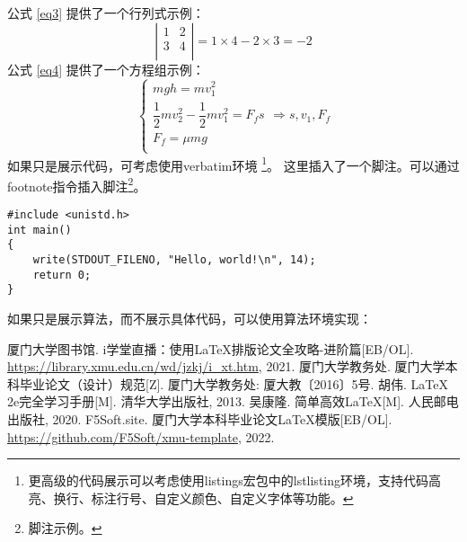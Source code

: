 \documentclass{xmu}
\begin{document}
公式 \ref{eq3} 提供了一个行列式示例：
\begin{equation}\label{eq3}
    \left|\begin{array}{cc}
        1 & 2 \\
        3 & 4 \\
    \end{array}\right|=1\times4-2\times3=-2
\end{equation}
公式 \ref{eq4} 提供了一个方程组示例：
\begin{equation}\label{eq4}
    \begin{cases}
        mgh=mv_1^2                         \\
        \dfrac12mv_2^2-\dfrac12mv_1^2=F_fs \\
        F_f=\mu mg                         \\
    \end{cases} \Rightarrow s,v_1,F_f
\end{equation}
如果只是展示代码，可考虑使用verbatim环境
\footnote{更高级的代码展示可以考虑使用listings宏包中的lstlisting环境，支持代码高亮、换行、标注行号、自定义颜色、自定义字体等功能。}。
这里插入了一个脚注。可以通过footnote指令插入脚注\footnote{脚注示例。}。
\begin{verbatim}
#include <unistd.h>
int main()
{
    write(STDOUT_FILENO, "Hello, world!\n", 14);
    return 0;
}
\end{verbatim}
如果只是展示算法，而不展示具体代码，可以使用算法环境实现：
\begin{algorithm}[!htb]
\end{algorithm}


\begin{reference}
    \begin{thebibliography}{5}
         厦门大学图书馆. i学堂直播：使用LaTeX排版论文全攻略-进阶篇[EB/OL]. \url{https://library.xmu.edu.cn/wd/jzkj/i_xt.htm}, 2021.
         厦门大学教务处. 厦门大学本科毕业论文（设计）规范[Z]. 厦门大学教务处: 厦大教〔2016〕5号.
         胡伟. LaTeX 2e完全学习手册[M]. 清华大学出版社, 2013.
         吴康隆. 简单高效LaTeX[M]. 人民邮电出版社, 2020.
         F5Soft.site. 厦门大学本科毕业论文LaTeX模版[EB/OL]. \url{https://github.com/F5Soft/xmu-template}, 2022.
    \end{thebibliography}
\end{reference}
\end{document}
